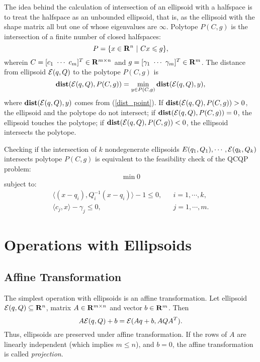 The idea behind the calculation of intersection of an ellipsoid with a
halfspace is to treat the halfspace as an unbounded ellipsoid, that is, as the
ellipsoid with the shape matrix  all but one of whose eigenvalues are $\infty$.
\bd\label{polytope}
Polytope $P(C,g)$ is the  intersection of a finite number
of closed halfspaces:
\[ P = \{x\in{\bf R}^n ~|~ Cx\leq g\}, \]
wherein $C=[c_1 ~ \cdots ~ c_m]^T\in{\bf R}^{m\times n}$ and
$g=[\gamma_1 ~ \cdots ~ \gamma_m]^T\in{\bf R}^m$.
\ed
The distance from ellipsoid $\EE(q,Q)$ to the polytope $P(C,g)$ is
\begin{equation}
{\bf dist}(\EE(q,Q),P(C,g))=\min_{y\in P(C,g)}{\bf dist}(\EE(q,Q),y),
\label{dist_poly}
\end{equation}
where ${\bf dist}(\EE(q,Q),y)$ comes from (\ref{dist_point}).
If ${\bf dist}(\EE(q,Q),P(C,g))>0$, the ellipsoid and the polytope
do not intersect;
if ${\bf dist}(\EE(q,Q),P(C,g))=0$, the ellipsoid touches the polytope;
if ${\bf dist}(\EE(q,Q),P(C,g))<0$, the ellipsoid intersects the
polytope.

Checking if the intersection of $k$ nondegenerate ellipsoids
$E(q_1,Q_1),\cdots,\EE(q_k,Q_k)$ intersects  polytope $P(C,g)$
is equivalent to the feasibility check of the QCQP problem:
\[ \min 0 \]
subject to:
\begin{eqnarray*}
\langle (x-q_i),Q_i^{-1}(x-q_i)\rangle - 1 \leq 0, & & i=1,\cdots,k,\\
\langle c_j, x\rangle - \gamma_j \leq 0, & & j=1,\cdots,m.
\end{eqnarray*}



\section{Operations with Ellipsoids}
\subsection{Affine Transformation}
The simplest operation with ellipsoids is an affine transformation.
Let ellipsoid $\EE(q,Q)\subseteq{\bf R}^n$, matrix $A\in{\bf R}^{m\times n}$
and vector $b\in{\bf R}^m$. Then
\begin{equation}
A\EE(q,Q) + b = \EE(Aq+b, AQA^T) .\label{affinetrans}
\end{equation}
Thus, ellipsoids are preserved under affine transformation.
If the rows of $A$ are linearly independent (which implies  $m\leq n$), and
$b=0$, the affine transformation is called {\it projection}.


